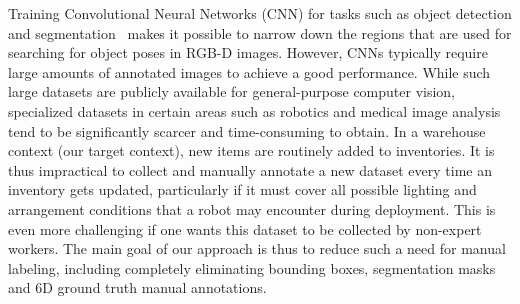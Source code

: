 \documentclass[letterpaper, 10 pt, conference]{ieeeconf}  %
\begin{document}
Training Convolutional Neural Networks (CNN) for tasks such as object detection and segmentation~\cite{Princeton,hernandez2016team,shelhamer2016fully} makes it possible to narrow down the regions that are used for searching for object poses in RGB-D images. However, CNNs typically require large amounts of annotated images to achieve a good performance. While such large datasets are publicly available for general-purpose computer vision, specialized datasets in certain areas such as robotics and medical image analysis tend to be significantly scarcer and time-consuming to obtain. In a warehouse context (our target context), new items are routinely added to inventories. It is thus impractical to collect and manually annotate a new dataset every time an inventory gets updated, particularly if it must cover all possible lighting and arrangement conditions that a robot may encounter during deployment. This is even more challenging if one wants this dataset to be collected by non-expert workers. The main goal of our approach is thus to reduce such a need for manual labeling, including completely eliminating bounding boxes, segmentation masks and 6D ground truth manual annotations.
\end{document}

